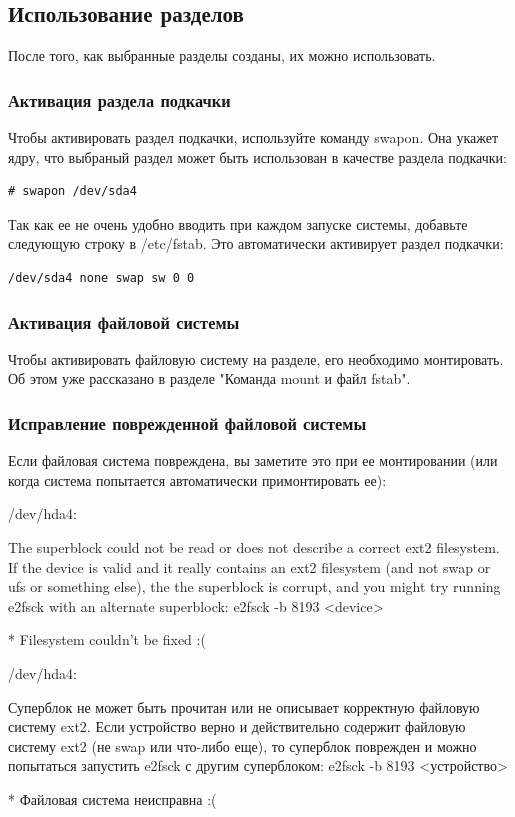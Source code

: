 \documentclass[10pt]{book}
\begin{document}
\subsection{Использование разделов}

После того, как выбранные разделы созданы, их можно использовать.

\subsubsection{Активация раздела подкачки}
Чтобы активировать раздел подкачки, используйте команду swapon. Она укажет ядру,  что выбраный раздел может быть использован в качестве раздела подкачки:
\begin{tcolorbox} 
\begin{lstlisting}
# swapon /dev/sda4
\end{lstlisting}
\end{tcolorbox}

Так как ее не очень удобно вводить при каждом запуске системы, добавьте следующую строку в /etc/fstab. Это автоматически активирует раздел подкачки:

\begin{tcolorbox} 
\begin{lstlisting}
/dev/sda4 none swap sw 0 0
\end{lstlisting}
\end{tcolorbox}

\subsubsection{Активация файловой системы}
Чтобы активировать файловую систему на разделе, его необходимо монтировать. Об этом уже рассказано в разделе "Команда mount и файл fstab".

\subsubsection{Исправление поврежденной файловой системы}
Если файловая система повреждена, вы заметите это при ее монтировании (или когда система попытается автоматически примонтировать ее):

\begin{tcolorbox} 
/dev/hda4:

The superblock could not be read or does not describe a correct ext2
filesystem. If the device is valid and it really contains an ext2
filesystem (and not swap or ufs or something else), the the superblock
is corrupt, and you might try running e2fsck with an alternate superblock:
e2fsck -b 8193 <device>

* Filesystem couldn't be fixed :(


/dev/hda4:

Суперблок не может быть прочитан или не описывает корректную файловую
систему ext2. Если устройство верно и действительно содержит файловую
систему ext2 (не swap или что-либо еще), то суперблок поврежден и можно 
попытаться запустить e2fsck с другим суперблоком:
e2fsck -b 8193 <устройство>

* Файловая система неисправна :(
\end{tcolorbox}
\end{document}

